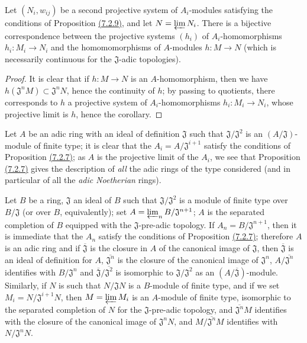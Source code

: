 \begin{cor}[7.2.10]
\label{0.7.2.10}
Let $(N_i,w_{ij})$ be a second projective system of $A_i$-modules satisfying the conditions
of Proposition \hyperref[0.7.2.9]{(7.2.9)}, and let $N=\varprojlim N_i$. There is a
bijective correspondence between the projective systems $(h_i)$ of $A_i$-homomorphisms
$h_i:M_i\to N_i$ and the homomomorphisms of $A$-modules $h:M\to N$ (which is necessarily
continuous for the $\mathfrak{J}$-adic topologies).
\end{cor}

\begin{proof}
\label{proof-0.7.2.10}
It is clear that if $h:M\to N$ is an $A$-homomorphism, then we have
$h(\mathfrak{J}^n M)\subset\mathfrak{J}^n N$, hence the continuity of $h$; by passing to
quotients, there corresponds to $h$ a projective system of $A_i$-homomorphisms
$h_i:M_i\to N_i$, whose projective limit is $h$, hence the corollary.
\end{proof}

\begin{rmk}[7.2.11]
\label{0.7.2.11}
Let $A$ be an adic ring with an ideal of definition $\mathfrak{J}$ such that
$\mathfrak{J}/\mathfrak{J}^2$ is an $(A/\mathfrak{J})$-module of finite type; it is clear
that the $A_i=A/\mathfrak{J}^{i+1}$ satisfy
the conditions of Proposition \hyperref[0.7.2.7]{(7.2.7)}; as $A$ is the projective
limit of the $A_i$, we see that Proposition \hyperref[0.7.2.7]{(7.2.7)} gives the
description of {\em all} the adic rings of the type considered (and in particular of all
the {\em adic Noetherian} rings).
\end{rmk}

\begin{exm}[7.2.12]
\label{0.7.2.12}
Let $B$ be a ring, $\mathfrak{J}$ an ideal of $B$ such that $\mathfrak{J}/\mathfrak{J}^2$ is
a module of finite type over $B/\mathfrak{J}$ (or over $B$, equivalently); set
$A=\varprojlim_n B/\mathfrak{J}^{n+1}$; $A$ is the separated completion of $B$ equipped with
the $\mathfrak{J}$-pre-adic topology. If $A_n=B/\mathfrak{J}^{n+1}$, then it is immediate
that the $A_n$ satisfy the conditions of Proposition \hyperref[0.7.2.7]{(7.2.7)};
therefore $A$ is an adic ring and if $\overline{\mathfrak{J}}$ is the closure in $A$ of the
canonical image of $\mathfrak{J}$, then $\overline{\mathfrak{J}}$ is an ideal of definition
for $A$, $\overline{\mathfrak{J}^n}$ is the closure of the canonical image of
$\mathfrak{J}^n$, $A/\overline{\mathfrak{J}^n}$ identifies with $B/\mathfrak{J}^n$ and
$\overline{\mathfrak{J}}/\overline{\mathfrak{J}^2}$ is isomorphic to
$\mathfrak{J}/\mathfrak{J}^2$ as an $(A/\overline{\mathfrak{J}})$-module. Similarly, if $N$
is such that $N/\mathfrak{J}N$ is a $B$-module of finite type, and if we set
$M_i=N/\mathfrak{J}^{i+1}N$, then $M=\varprojlim M_i$ is an $A$-module of finite type,
isomorphic to the separated completion of $N$ for the $\mathfrak{J}$-pre-adic topology, and
$\overline{\mathfrak{J}^n}M$ identifies with the closure of the canonical image of
$\mathfrak{J}^n N$, and $M/\overline{\mathfrak{J}^n}M$ identifies with
$N/\mathfrak{J}^n N$.
\end{exm}

